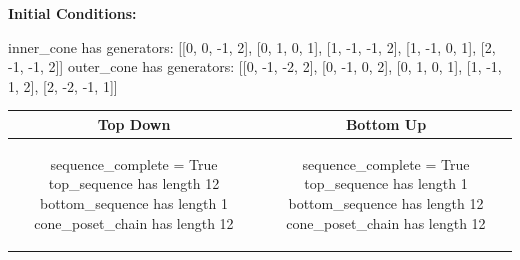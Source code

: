 \documentclass[10pt]{article}
\begin{document}
\textbf{Initial Conditions:}
\begin{SAGE}
inner_cone has generators: 
[[0, 0, -1, 2], [0, 1, 0, 1], [1, -1, -1, 2], [1, -1, 0, 1], [2, -1, -1, 2]]
outer_cone has generators: 
[[0, -1, -2, 2], [0, -1, 0, 2], [0, 1, 0, 1], [1, -1, 1, 2], [2, -2, -1, 1]]

\end{SAGE}
\begin{tabular}{c|c}
\textbf{Top Down} & \textbf{Bottom Up} \\ \hline  
\begin{SAGE}
sequence_complete = True
top_sequence has length 12
bottom_sequence has length 1
cone_poset_chain has length 12
\end{SAGE} 
&
\begin{SAGE}
sequence_complete = True
top_sequence has length 1
bottom_sequence has length 12
cone_poset_chain has length 12
\end{SAGE} 
\\ \hline


\end{tabular}
\end{document}

